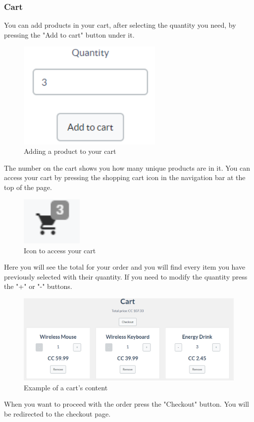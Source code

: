 		\subsubsection{Cart}
		You can add products in your cart, after selecting the quantity you need, 
		by pressing the "Add to cart" button under it.
	\begin{figure}[H]
		\includegraphics[width=7cm]{res/images/add_to_cart.png}
		\centering
		\caption{Adding a product to your cart}
	\end{figure}
	\noindent The number on the cart shows you how many unique products are 
	in it. You can access your cart by pressing the shopping cart icon in 
	the navigation bar at the top of the page.
	\begin{figure}[H]
		\includegraphics[width=3cm]{res/images/cart_icon.png}
		\centering
		\caption{Icon to access your cart}
	\end{figure}
	\noindent Here you will see the total for your order and you will find 
	every item you have previously selected with their quantity. If you 
	need to modify the quantity press the "+" or "-" buttons.
	\begin{figure}[H]
		\includegraphics[width=15cm]{res/images/cart_example.png}
		\centering
		\caption{Example of a cart's content}
	\end{figure}
	\noindent When you want to proceed with the order press the "Checkout" button. 
	You will be redirected to the checkout page.
